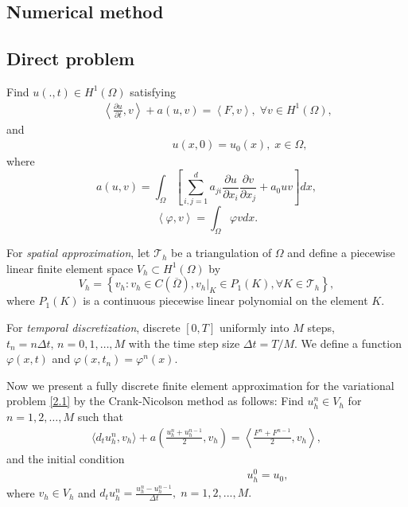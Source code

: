 \documentclass[notitlepage,a4paper,fleqn,9pt]{icmfarticle}
\begin{document}
\begin{multicols}{2}
\section{Numerical method} 
\subsection{Direct problem}

Find $u(.,t)\in H^1(\Omega)$ satisfying
\begin{align}\label{2.1}
	\qquad\left\langle \frac{\partial u}{\partial t}, v \right\rangle+a\left(u, v\right)=\left\langle F, v \right\rangle,\; \forall v\in H^1(\Omega),
\end{align}
and 
\begin{align}\label{2.2}
	\qquad\qquad\qquad u(x, 0)=u_0(x), \; x\in \Omega,
\end{align}
where 
$$a\left(u, v\right)=\int_{\Omega}\left[\sum_{i, j=1}^{d}a_{ji}\frac{\partial u}{\partial x_i}\frac{\partial v}{\partial x_j}+a_0uv\right]dx,$$
$$\left\langle \varphi, v \right\rangle=\int_{\Omega}\varphi vdx.$$

For \textit{spatial approximation}, let $\mathcal{T}_h$ be a triangulation of $\Omega$ and define a piecewise linear finite element space $V_h \subset H^1(\Omega)$ by
$$V_h=\left\{v_h:v_h\in C(\overline{\Omega}), v_h|_K\in P_1(K), \forall K\in \mathcal{T}_h\right\},$$
where $P_1(K)$ is a continuous piecewise linear polynomial on the element $K$. 

For \textit{temporal discretization}, discrete $[0, T]$ uniformly into $M$ steps, $t_n=n\Delta t,\, n=0, 1, \dots, M$ with the time step size $\Delta t = T/M$. We define a function $\varphi(x, t)$ and $\varphi(x, t_n)=\varphi^n(x)$.

Now we present a fully discrete finite element approximation for the variational problem \eqref{2.1} by the Crank-Nicolson method as follows: Find $u^n_h\in V_h$ for $n=1, 2, \dots, M$ such that
\begin{align}\label{2.3}
	\langle d_tu^n_h, v_h \rangle+a\left(\frac{u^n_h+u^{n-1}_h}{2}, v_h\right)=\left\langle \frac{F^n+F^{n-1}}{2}, v_h \right\rangle,
\end{align}
and the initial condition 
\begin{align}\label{2.4}
	\qquad\qquad\qquad\qquad\qquad\quad u^0_h=u_0,
\end{align}
where $v_h\in V_h$ and $d_tu^n_h=\frac{u^n_h-u^{n-1}_h}{\Delta t}, \; n=1, 2, ..., M.$


\end{multicols}
\end{document}
